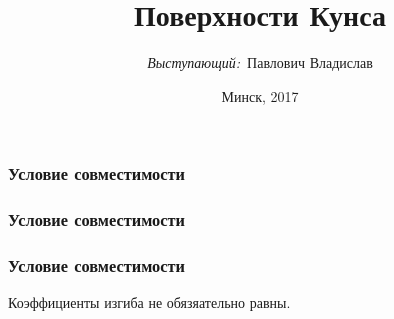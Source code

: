 \documentclass[14pt]{beamer}
\title{Поверхности Кунса}
\author{\small{%
\emph{Выступающий:}~Павлович Владислав}
\vspace{20pt}%
}
\date{\small{Минск, 2017}}
\begin{document}
\maketitle

\begin{frame}
\frametitle{Условие совместимости}
\end{frame}

\begin{frame}
\frametitle{Условие совместимости}
\end{frame}

\begin{frame}
\frametitle{Условие совместимости}
Коэффициенты изгиба не обязяательно равны.
\end{frame}
\end{document}
